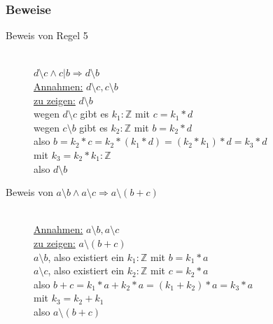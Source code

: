 \documentclass[a4paper,10pt]{article}
\newcommand{\ZN}{\mathbb{Z}} %
\newcommand{\Teilt}{\setminus} %
\newcommand{\Ra}{\Rightarrow}
\begin{document}
\subsubsection{Beweise}
\begin{description}
	\item[Beweis von Regel 5] \hfill \\
		$d \Teilt c \wedge c|b \Ra d \Teilt b$ \\
		\uline {Annahmen:} $d \Teilt c, c \Teilt b$ \\
		\uline {zu zeigen:} $d \Teilt b$ \\
		wegen $d \Teilt c$ gibt es $k_1:\ZN$ mit $c=k_1*d$ \\
		wegen $c \Teilt b$ gibt es $k_2:\ZN$ mit $b=k_2*d$ \\
		also $b=k_2*c=k_2*(k_1*d)=(k_2*k_1)*d=k_3*d$ \\
		mit $k_3=k_2*k_1:\ZN$ \\
		also $d \Teilt b$
	\item[Beweis von $a \Teilt b \wedge a \Teilt c \Ra a \Teilt (b+c)$] \hfill \\
		\uline {Annahmen:} $a \Teilt b, a \Teilt c$ \\
		\uline {zu zeigen:} $a \Teilt (b+c)$ \\
		$a \Teilt b$, also existiert ein $k_1:\ZN$ mit $b=k_1*a$ \\
		$a \Teilt c$, also existiert ein $k_2:\ZN$ mit $c=k_2*a$ \\
		also $b+c=k_1*a+k_2*a=(k_1+k_2)*a=k_3*a$ \\
		mit $k_3=k_2+k_1$ \\
		also $ a \Teilt (b+c)$
\end{description}
\end{document}
